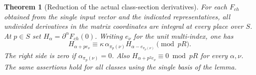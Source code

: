 \documentclass[a4paper,11pt]{article}
\newtheorem{theorem}[proposition]{Theorem}
\theoremstyle{definition}
\theoremstyle{remark}
\numberwithin{equation}{section}
\begin{document}
\begin{theorem}[Reduction of the actual class-section derivatives]\label{thm:jet63}
For each \(F_{ch}\) obtained from the single input vector and
the indicated representatives, all undivided derivatives in the
matrix coordinates are integral at every place over \(S\).
At \(p\in S\) set \(H_\alpha=\partial^\alpha F_{ch}(0)\).
Writing \(e_\nu\) for the unit multi-index, one has
\begin{equation}
 H_{\alpha+p e_\nu}
      \equiv\kappa\,\alpha_{\pi_p(\nu)}
                H_{\alpha-e_{\pi_p(\nu)}}\pmod{pR}.
                                                     \label{eq:class63}
\end{equation}
The right side is zero if \(\alpha_{\pi_p(\nu)}=0\). Also
\(H_{\alpha+p^2 e_\nu}\equiv0\bmod pR\) for every \(\alpha,\nu\).
The same assertions hold for all classes using the single basis
of the lemma.
\end{theorem}
\end{document}
